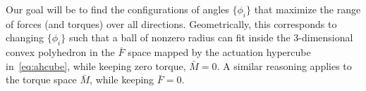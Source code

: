 Our goal will be to find the configurations of angles $\{\phi_i\}$
that maximize the range of forces (and torques) over all
directions.
Geometrically, this corresponds to changing $\{\phi_i\}$
such that a ball of nonzero radius can fit inside the 3-dimensional
convex polyhedron in the $\bar{F}$ space mapped by the actuation
hypercube in~\eqref{eq:ahcube}, while keeping zero torque,
$\bar{M}=0$. A similar reasoning applies to the torque space
$\bar{M}$, while keeping $\bar{F}=0$. 


